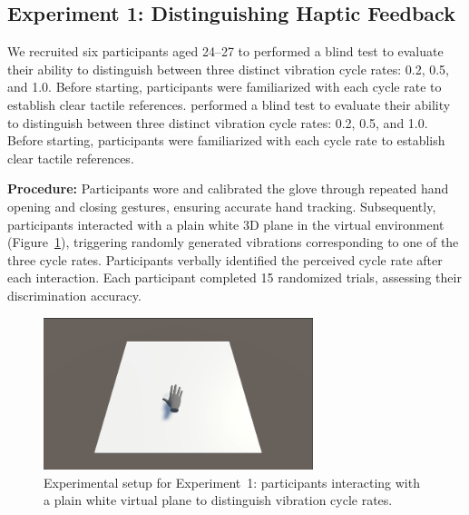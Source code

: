 \documentclass[graybox]{svmult}
\begin{document}


\subsection{Experiment 1: Distinguishing Haptic Feedback}
We recruited six participants aged 24–27 to performed a blind test to evaluate their ability to distinguish between three distinct vibration cycle rates: 0.2, 0.5, and 1.0. Before starting, participants were familiarized with each cycle rate to establish clear tactile references.
performed a blind test to evaluate their ability to distinguish between three distinct vibration cycle rates: 0.2, 0.5, and 1.0. Before starting, participants were familiarized with each cycle rate to establish clear tactile references.

\textbf{Procedure:} Participants wore and calibrated the glove through repeated hand opening and closing gestures, ensuring accurate hand tracking. Subsequently, participants interacted with a plain white 3D plane in the virtual environment (Figure~\ref{fig:experiment1_setup}), triggering randomly generated vibrations corresponding to one of the three cycle rates. Participants verbally identified the perceived cycle rate after each interaction. Each participant completed 15 randomized trials, assessing their discrimination accuracy.

\begin{figure}\centering
	\includegraphics[width=0.7\textwidth]{figure/ex1.png}%
	\caption{Experimental setup for Experiment~1: participants interacting with a plain white virtual plane to distinguish vibration cycle rates.}\label{fig:experiment1_setup}
\end{figure}
\end{document}
